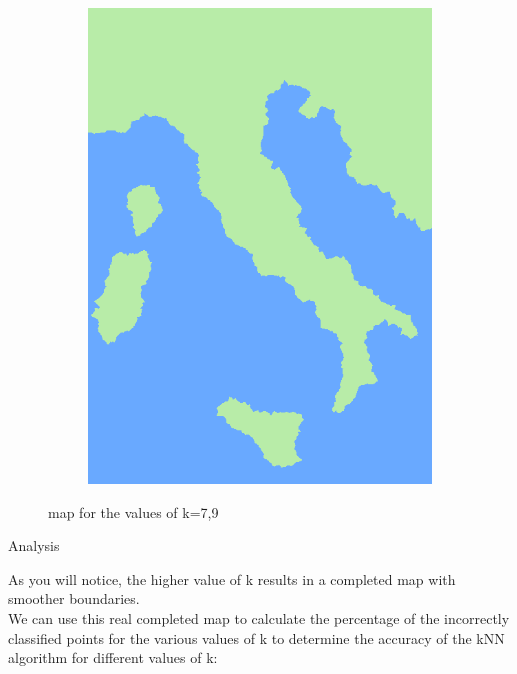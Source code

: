 \documentclass{beamer}
\begin{document}
\begin{frame}
\begin{figure}
\begin{subfigure}[b]{0.4\textwidth}
        \end{subfigure}
    \hfill
        \begin{subfigure}[b]{0.4\textwidth}
        \centering
         \includegraphics[width=\textwidth]{images/italy5.png}
         
     \end{subfigure}
     
        \caption{map for the values of k=7,9}
        \label{fig:two figs}
\end{figure}

 \end{frame}
 
 
\begin{frame}{Analysis}\vspace{10pt}
    
    As you will notice, the higher value of k results in a completed map with smoother
boundaries. \\
We can use this real completed map to calculate the percentage of the incorrectly classified
points for the various values of k to determine the accuracy of the kNN algorithm for
different values of k:
\end{frame}
\end{document}

